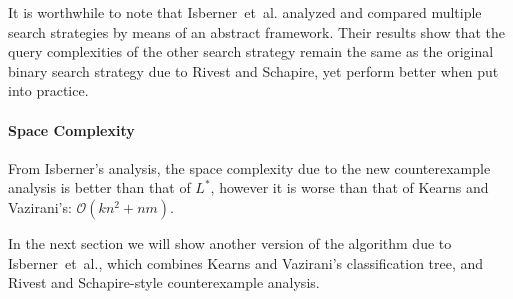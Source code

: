 \documentclass[multi,crop=false,class=article]{standalone}
\begin{document}
It is worthwhile to note that Isberner~et~al. analyzed and compared multiple
search strategies by means of an abstract framework\cite{Isberner2014a}. Their
results show that the query complexities of the other search strategy remain the
same as the original binary search strategy due to Rivest and Schapire, yet
perform better when put into practice.

\paragraph{Space Complexity} From Isberner's analysis\cite{Isberner2014b}, the
space complexity due to the new counterexample analysis is better than that of
$L^*$, however it is worse than that of Kearns and Vazirani's:
$\mathcal{O}(kn^2 + nm)$.

In the next section we will show another version of the algorithm due to
Isberner~et~al., which combines Kearns and Vazirani's classification tree, and
Rivest and Schapire-style counterexample analysis.  
\end{document}
